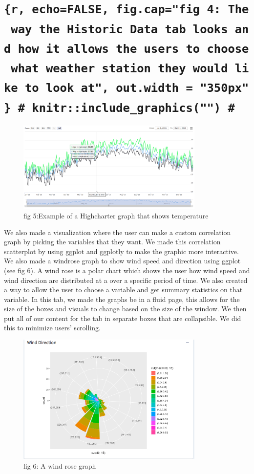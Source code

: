 \documentclass[10pt,letterpaper]{article}
\begin{document}
\section{\texorpdfstring{\texttt{\{r,\ echo=FALSE,\ fig.cap="fig\ 4:\ The\ way\ the\ Historic\ Data\ tab\ looks\ and\ how\ it\ allows\ the\ users\ to\ choose\ what\ weather\ station\ they\ would\ like\ to\ look\ at",\ out.width\ =\ "350px"\}\ \#\ knitr::include\_graphics("")\ \#}}{\{r, echo=FALSE, fig.cap="fig 4: The way the Historic Data tab looks and how it allows the users to choose what weather station they would like to look at", out.width = "350px"\} \# knitr::include\_graphics("") \#}}\label{r-echofalse-fig.capfig-4-the-way-the-historic-data-tab-looks-and-how-it-allows-the-users-to-choose-what-weather-station-they-would-like-to-look-at-out.width-350px-knitrinclude_graphics}

\begin{figure}
\includegraphics[width=350px]{highchart} \caption{fig 5:Example of a Highcharter graph that shows temperature}\label{fig:unnamed-chunk-2}
\end{figure}

We also made a visualization where the user can make a custom
correlation graph by picking the variables that they want. We made this
correlation scatterplot by using ggplot and ggplotly to make the graphic
more interactive. We also made a windrose graph to show wind speed and
direction using ggplot (see fig 6). A wind rose is a polar chart which
shows the user how wind speed and wind direction are distributed at a
over a specific period of time. We also created a way to allow the user
to choose a variable and get summary statistics on that variable. In
this tab, we made the graphs be in a fluid page, this allows for the
size of the boxes and visuals to change based on the size of the window.
We then put all of our content for the tab in separate boxes that are
collapsible. We did this to minimize users' scrolling.

\begin{figure}
\includegraphics[width=350px]{windrose} \caption{fig 6: A wind rose graph}\label{fig:unnamed-chunk-3}
\end{figure}
\end{document}

